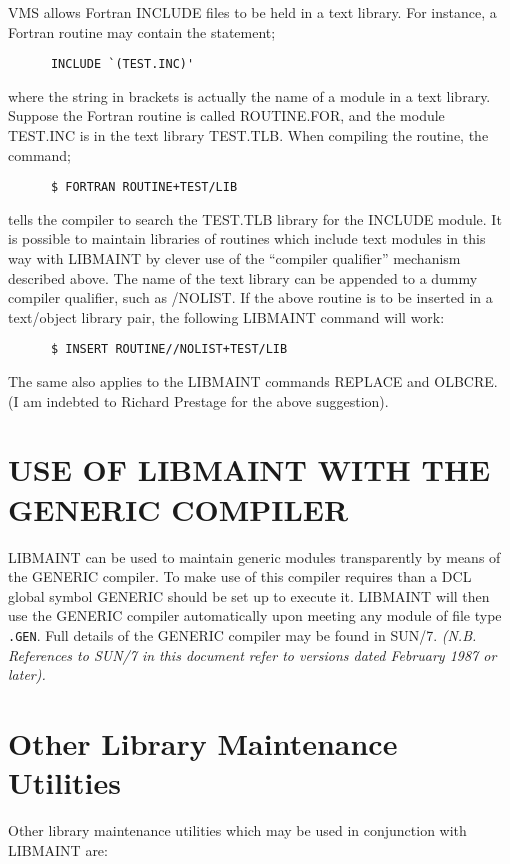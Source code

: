 VMS allows Fortran INCLUDE files to be held in a text library.
For instance, a Fortran routine may contain the statement;
\begin{verbatim}
      INCLUDE `(TEST.INC)'
\end{verbatim}
where the string in brackets is actually the name of a module in
a text library.
Suppose the Fortran routine is called ROUTINE.FOR, and the module
TEST.INC is in the text library TEST.TLB. 
When compiling the routine, the command;
\begin{verbatim}
      $ FORTRAN ROUTINE+TEST/LIB
\end{verbatim}
tells the compiler to search the TEST.TLB library for the INCLUDE 
module.
It is possible to maintain libraries of routines which include text
modules in this way with LIBMAINT by clever use of the ``compiler
qualifier'' mechanism described above. 
The name of the text library can be appended to a dummy compiler
qualifier, such as /NOLIST.
If the above routine is to be inserted in a text/object library pair,
the following LIBMAINT command will work:
\begin{verbatim}
      $ INSERT ROUTINE//NOLIST+TEST/LIB
\end{verbatim}
The same also applies to the LIBMAINT commands REPLACE and OLBCRE.
(I am indebted to Richard Prestage for the above suggestion).

\section{USE OF LIBMAINT WITH THE GENERIC COMPILER}
LIBMAINT can be used to maintain generic modules transparently
by means of the GENERIC compiler.
To make use of this compiler requires than a DCL global symbol
GENERIC should be set up to execute it.
LIBMAINT will then use the GENERIC compiler automatically
upon meeting any module of file type {\tt .GEN}.
Full details of the GENERIC compiler may be found in SUN/7.
{\it (N.B. References to SUN/7 in this document refer to versions
dated February 1987 or later).}

\section{Other Library Maintenance Utilities}

Other library maintenance utilities which may be used in conjunction
with LIBMAINT are:


\settowidth{\numlen}{00000000000}
\settowidth{\labelsep}{000}

